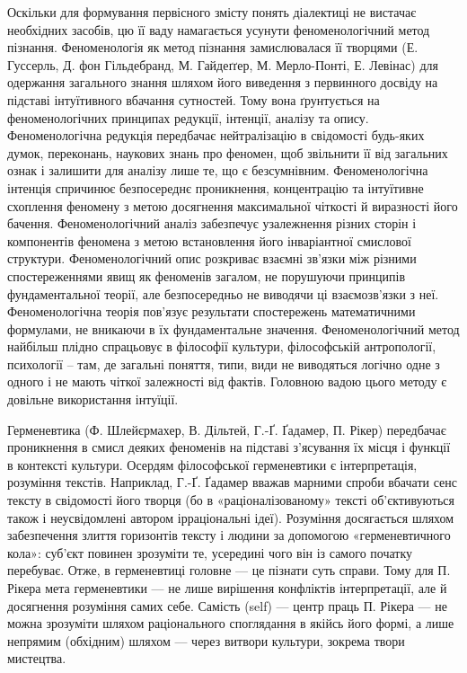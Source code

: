 Оскільки для формування первісного змісту понять діалектиці не вистачає
необхідних засобів, цю її ваду намагається усунути феноменологічний метод
пізнання. Феноменологія як метод пізнання замислювалася її творцями (Е.
Гуссерль, Д. фон Гільдебранд, М. Гайдеґґер, М. Мерло-Понті, Е. Левінас) для
одержання загального знання шляхом його виведення з первинного досвіду на
підставі інтуїтивного вбачання сутностей. Тому вона ґрунтується на
феноменологічних принципах редукції, інтенції, аналізу та опису.
Феноменологічна редукція передбачає нейтралізацію в свідомості будь-яких
думок, переконань, наукових знань про феномен, щоб звільнити її від загальних
ознак і залишити для аналізу лише те, що є безсумнівним. Феноменологічна
інтенція спричинює безпосереднє проникнення, концентрацію та інтуїтивне
схоплення феномену з метою досягнення максимальної чіткості й виразності
його бачення. Феноменологічний аналіз забезпечує узалежнення різних сторін і
компонентів феномена з метою встановлення його інваріантної смислової
структури. Феноменологічний опис розкриває взаємні зв’язки між різними
спостереженнями явищ як феноменів загалом, не порушуючи принципів
фундаментальної теорії, але безпосередньо не виводячи ці взаємозв’язки з неї.
Феноменологічна теорія пов’язує результати спостережень математичними
формулами, не вникаючи в їх фундаментальне значення. Феноменологічний
метод найбільш плідно спрацьовує в філософії культури, філософській
антропології, психології – там, де загальні поняття, типи, види не виводяться
логічно одне з одного і не мають чіткої залежності від фактів. Головною вадою
цього методу є довільне використання інтуїції.

Герменевтика (Ф. Шлейєрмахер, В. Дільтей, Г.-Ґ. Ґадамер, П. Рікер)
передбачає проникнення в смисл деяких феноменів на підставі з’ясування їх
місця і функції в контексті культури. Осердям філософської герменевтики є
інтерпретація, розуміння текстів. Наприклад, Г.-Ґ. Ґадамер вважав марними
спроби вбачати сенс тексту в свідомості його творця (бо в «раціоналізованому»
тексті об’єктивуються також і неусвідомлені автором ірраціональні ідеї).
Розуміння досягається шляхом забезпечення злиття горизонтів тексту і людини
за допомогою «герменевтичного кола»: суб’єкт повинен зрозуміти те, усередині
чого він із самого початку перебуває. Отже, в герменевтиці головне --- це
пізнати суть справи. Тому для П. Рікера мета герменевтики --- не лише
вирішення конфліктів інтерпретації, але й досягнення розуміння самих себе.
Самість (self) --- центр праць П. Рікера --- не можна зрозуміти шляхом
раціонального споглядання в якійсь його формі, а лише непрямим (обхідним)
шляхом --- через витвори культури, зокрема твори мистецтва.

